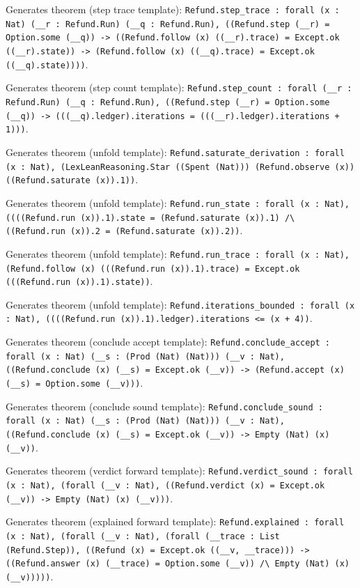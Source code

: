 \documentclass[11pt]{article}
\begin{document}
\noindent Generates theorem (step trace template): \texttt{Refund.step\_trace : forall (x : Nat) (\_\_r : Refund.Run) (\_\_q : Refund.Run), ((Refund.step (\_\_r) = Option.some (\_\_q)) -> ((Refund.follow (x) ((\_\_r).trace) = Except.ok ((\_\_r).state)) -> (Refund.follow (x) ((\_\_q).trace) = Except.ok ((\_\_q).state))))}.\par
\noindent Generates theorem (step count template): \texttt{Refund.step\_count : forall (\_\_r : Refund.Run) (\_\_q : Refund.Run), ((Refund.step (\_\_r) = Option.some (\_\_q)) -> (((\_\_q).ledger).iterations = (((\_\_r).ledger).iterations + 1)))}.\par
\noindent Generates theorem (unfold template): \texttt{Refund.saturate\_derivation : forall (x : Nat), (LexLeanReasoning.Star ((Spent (Nat))) (Refund.observe (x)) ((Refund.saturate (x)).1))}.\par
\noindent Generates theorem (unfold template): \texttt{Refund.run\_state : forall (x : Nat), ((((Refund.run (x)).1).state = (Refund.saturate (x)).1) /\textbackslash{} ((Refund.run (x)).2 = (Refund.saturate (x)).2))}.\par
\noindent Generates theorem (unfold template): \texttt{Refund.run\_trace : forall (x : Nat), (Refund.follow (x) (((Refund.run (x)).1).trace) = Except.ok (((Refund.run (x)).1).state))}.\par
\noindent Generates theorem (unfold template): \texttt{Refund.iterations\_bounded : forall (x : Nat), ((((Refund.run (x)).1).ledger).iterations <= (x + 4))}.\par
\noindent Generates theorem (conclude accept template): \texttt{Refund.conclude\_accept : forall (x : Nat) (\_\_s : (Prod (Nat) (Nat))) (\_\_v : Nat), ((Refund.conclude (x) (\_\_s) = Except.ok (\_\_v)) -> (Refund.accept (x) (\_\_s) = Option.some (\_\_v)))}.\par
\noindent Generates theorem (conclude sound template): \texttt{Refund.conclude\_sound : forall (x : Nat) (\_\_s : (Prod (Nat) (Nat))) (\_\_v : Nat), ((Refund.conclude (x) (\_\_s) = Except.ok (\_\_v)) -> Empty (Nat) (x) (\_\_v))}.\par
\noindent Generates theorem (verdict forward template): \texttt{Refund.verdict\_sound : forall (x : Nat), (forall (\_\_v : Nat), ((Refund.verdict (x) = Except.ok (\_\_v)) -> Empty (Nat) (x) (\_\_v)))}.\par
\noindent Generates theorem (explained forward template): \texttt{Refund.explained : forall (x : Nat), (forall (\_\_v : Nat), (forall (\_\_trace : List (Refund.Step)), ((Refund (x) = Except.ok ((\_\_v, \_\_trace))) -> ((Refund.answer (x) (\_\_trace) = Option.some (\_\_v)) /\textbackslash{} Empty (Nat) (x) (\_\_v)))))}.\par
\end{document}
